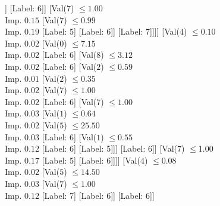\documentclass[margin=10pt]{standalone}
\begin{document}
\begin{forest}
										[Val($6$) $ \leq 61.50$ \\ Imp. $0.01$
											[Val($10$) $ \leq 10.65$ \\ Imp. $0.02$
												[Val($9$) $ \leq 0.60$ \\ Imp. $0.05$
													[Label: 6]
													[Val($9$) $ \leq 0.69$ \\ Imp. $0.11$
														[Val($1$) $ \leq 0.75$ \\ Imp. $0.06$
															[Val($7$) $ \leq 0.99$ \\ Imp. $0.07$
																[Label: 6]
																[Label: 5]]
															[Label: 6]]
														[Val($7$) $ \leq 1.00$ \\ Imp. $0.15$
															[Val($7$) $ \leq 0.99$ \\ Imp. $0.19$
																[Label: 5]
																[Label: 6]]
															[Label: 7]]]]
												[Val($4$) $ \leq 0.10$ \\ Imp. $0.02$
													[Val($0$) $ \leq 7.15$ \\ Imp. $0.02$
														[Label: 6]
														[Val($8$) $ \leq 3.12$ \\ Imp. $0.02$
															[Label: 6]
															[Val($2$) $ \leq 0.59$ \\ Imp. $0.01$
																[Val($2$) $ \leq 0.35$ \\ Imp. $0.02$
																	[Val($7$) $ \leq 1.00$ \\ Imp. $0.02$
																		[Label: 6]
																		[Val($7$) $ \leq 1.00$ \\ Imp. $0.03$
																			[Val($1$) $ \leq 0.64$ \\ Imp. $0.02$
																				[Val($5$) $ \leq 25.50$ \\ Imp. $0.03$
																					[Label: 6]
																					[Val($1$) $ \leq 0.55$ \\ Imp. $0.12$
																						[Label: 6]
																						[Label: 5]]]
																				[Label: 6]]
																			[Val($7$) $ \leq 1.00$ \\ Imp. $0.17$
																				[Label: 5]
																				[Label: 6]]]]
																	[Val($4$) $ \leq 0.08$ \\ Imp. $0.02$
																		[Val($5$) $ \leq 14.50$ \\ Imp. $0.03$
																			[Val($7$) $ \leq 1.00$ \\ Imp. $0.12$
																				[Label: 7]
																				[Label: 6]]
																			[Label: 6]]

\end{forest}
\end{document}
